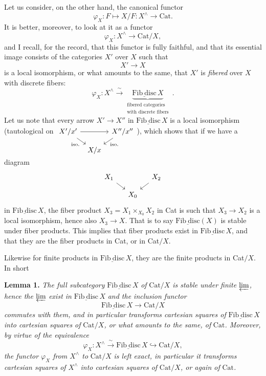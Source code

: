 \documentclass[11pt]{article}
\newcommand{\printedpage}[1]{\marginpar{\footnotesize p.~#1}}
\newcommand{\msp}[1]{\marginpar{\footnotesize [#1]}}
\newcommand{\Cat}{\mathrm{Cat}}
\newcommand{\Fibdisc}{\underline{\mathrm{Fib\ disc}}}
\begin{document}
Let us consider, on the other hand, the canonical functor
\[
\varphi_X : F \longmapsto X/F : X^{\wedge} \longrightarrow \mathrm{Cat}.
\]
It is better, moreover, to look at it as a functor
\[
\varphi_X : X^{\wedge} \longrightarrow \mathrm{Cat}/X,
\]
and I recall, for the record, that this functor is fully faithful, and that its essential image consists of the categories $X'$ over $X$ such that
\[
X' \longrightarrow X
\]
\msp{page 163}
is a local isomorphism, or what amounts to the same, that $X'$ is \textit{fibered} over $X$ with discrete fibers:
\[
\varphi_X : X^{\wedge} \xrightarrow{\ \sim\ } \underbrace{\Fibdisc\, X}_{\substack{\text{fibered categories}\\ \text{with discrete fibers}}} \ .
\]
Let us note that every arrow $X' \longrightarrow X''$ in $\Fibdisc\, X$ is a local isomorphism (tautological on $\begin{tikzcd}[ampersand replacement=\&, row sep=small, column sep=tiny, baseline=(\tikzcdmatrixname-1-1.base)] X'/x' \ar[rr] \ar[dr, "\text{iso.}"'] \& \& X''/x'' \ar[dl, "\text{iso.}"] \\ \& X/x \& \end{tikzcd}$), which shows that if we have a diagram
\[
\begin{tikzcd}[row sep=small, column sep=small]
X_1 \ar[dr] & & X_2 \ar[dl] \\
& X_0 &
\end{tikzcd}
\]
in $\Fibdisc\, X$, the fiber product $X_3 = X_1 \times_{X_0} X_2$ in Cat is such that $X_3 \longrightarrow X_2$ is a local isomorphism, hence also $X_3 \longrightarrow X$. That is to say $\Fibdisc(X)$ is stable under fiber products. This implies that fiber products exist in $\Fibdisc\, X$, and that they are the fiber products in Cat, or in Cat$/X$.

\printedpage{112}
\msp{page 164}
Likewise for finite products in $\Fibdisc\, X$, they are the finite products in Cat$/X$. In short

\textbf{Lemma 1.} \textit{The full subcategory} $\Fibdisc\, X$ \textit{of} $\Cat/X$ \textit{is stable under finite} $\varprojlim$\textit{, hence the} $\varprojlim$ \textit{exist in} $\Fibdisc\, X$ \textit{and the inclusion functor}
\[
\Fibdisc\, X \longrightarrow \Cat/X
\]
\textit{commutes with them, and in particular transforms cartesian squares of} $\Fibdisc\, X$ \textit{into cartesian squares of} $\Cat/X$\textit{, or what amounts to the same, of} $\Cat$\textit{. Moreover, by virtue of the equivalence}
\[
\varphi_X : X^{\wedge} \xrightarrow{\ \sim\ } \Fibdisc\, X \hookrightarrow \Cat/X,
\]
\textit{the functor $\varphi_X$ from $X^{\wedge}$ to} $\Cat/X$ \textit{is left exact, in particular it transforms cartesian squares of $X^{\wedge}$ into cartesian squares of} $\Cat/X$\textit{, or again of} $\Cat$\textit{.} %
\end{document}
